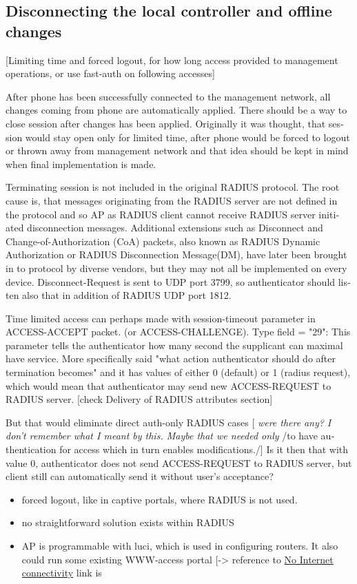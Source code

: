 \documentclass[12pt,a4paper,english]{tutthesis}
\begin{document}
\begin{otherlanguage}{english}
\section{Disconnecting the local controller and offline changes}
\label{sec-5-3}
[Limiting time and forced logout, for how long access provided to
management operations, or use fast-auth on following accesses]

After phone has been successfully connected to the management network,
all changes coming from 
phone are automatically applied. There should be a way to close
session after changes has been applied. Originally it was thought,
that session would stay open only for limited time, after phone would
be forced to logout or thrown away from management network and 
that idea should be kept in mind when final implementation is made.



Terminating session is not included in the original RADIUS protocol.
The root cause is, that 
messages originating from the RADIUS server are not
defined in the protocol and so AP as RADIUS client cannot receive
RADIUS server initiated disconnection messages. Additional extensions
such as Disconnect and Change-of-Authorization (CoA) packets, also
known as RADIUS Dynamic Authorization or RADIUS Disconnection
Message(DM),  have later been brought in\cite{rfc5176} to protocol by
diverse vendors, but they may not all be implemented on every device. 
Disconnect-Request is sent to UDP port 3799, so authenticator should
listen also that in addition of RADIUS UDP port 1812.






Time limited access can perhaps made with session-timeout parameter
in ACCESS-ACCEPT packet. (or ACCESS-CHALLENGE). Type field = "29":
This parameter tells the authenticator how many second the supplicant
can maximal have service. More specifically said "what action
authenticator should do after termination becomes" and it has values
of either 0 (default) or 1 (radius request), which would mean that
authenticator may send new ACCESS-REQUEST to RADIUS server.  [check
Delivery of RADIUS attributes section]

But that would eliminate direct auth-only RADIUS cases [ \emph{were there}
\emph{any? I don't remember what I meant by this. Maybe that we needed only}
/to have authentication for access which in turn enables modifications./]
Is it then that with value 0, authenticator does not send
ACCESS-REQUEST to RADIUS server, but client still can automatically send it without 
user's acceptance?
\begin{itemize}
\item forced logout, like in captive portals, where RADIUS is not used.
\item no straightforward solution exists within RADIUS
\item AP is programmable with luci, which is used in configuring routers. It also could run some existing WWW-access
portal [-> reference to \hyperref[text:nointernet]{No Internet connectivity} link is
\end{itemize}


\end{otherlanguage}
\end{document}

